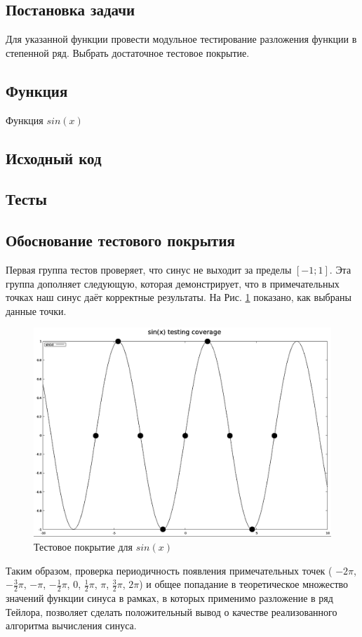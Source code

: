 \subsection{Постановка задачи}
Для указанной функции провести модульное тестирование разложения функции в степенной ряд. Выбрать достаточное тестовое покрытие.
\subsection{Функция}
Функция $ sin(x) $
\subsection{Исходный код}

\subsection{Тесты}

\subsection{Обоснование тестового покрытия}
Первая группа тестов проверяет, что синус не выходит за пределы $ [-1; 1] $.
Эта группа дополняет следующую, которая демонстрирует, что в примечательных точках
наш синус даёт корректные результаты. На Рис. \ref{f:sin-cover} показано, как
выбраны данные точки.
\begin{figure}[H]
  \centering
  \includegraphics[scale=0.5]{./sin-cover.png}
  \caption{Тестовое покрытие для $ sin(x) $}
  \label{f:sin-cover}
\end{figure}

Таким образом, проверка периодичность появления примечательных точек ( $ -2\pi $,
$ -\frac{3}{2}\pi $, $ -\pi $, $ -\frac{1}{2}\pi $, $ 0 $, $ \frac{1}{2}\pi $,
$ \pi $, $ \frac{3}{2}\pi $, $ 2\pi $) и общее попадание в теоретическое множество
значений функции синуса в рамках, в которых применимо разложение в ряд Тейлора,
позволяет сделать положительный вывод о качестве реализованного алгоритма вычисления
синуса.

